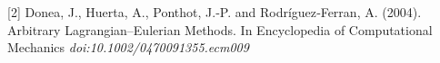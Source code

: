 \begin{frame}
\begin{columns}[c]
\begin{center}
\end{center}
\end{columns}

\vspace{0.3cm}
\tiny [2]
Donea, J., Huerta, A., Ponthot, J.‐P. and Rodríguez‐Ferran, A. (2004). Arbitrary Lagrangian–Eulerian Methods. In Encyclopedia of Computational Mechanics \textit{doi:10.1002/0470091355.ecm009}
\end{frame}




